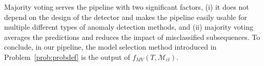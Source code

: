Majority voting serves the pipeline with two significant factors, (i) it does not depend on the design of the detector and makes the pipeline easily usable for multiple different types of anomaly detection methods, and (ii) majority voting averages the predictions and reduces the impact of misclassified subsequences. To conclude, in our pipeline, the model selection method introduced in Problem~\ref{prob:probdef} is the output of $f_{MV}(T,\mathcal{M}_{cl})$.